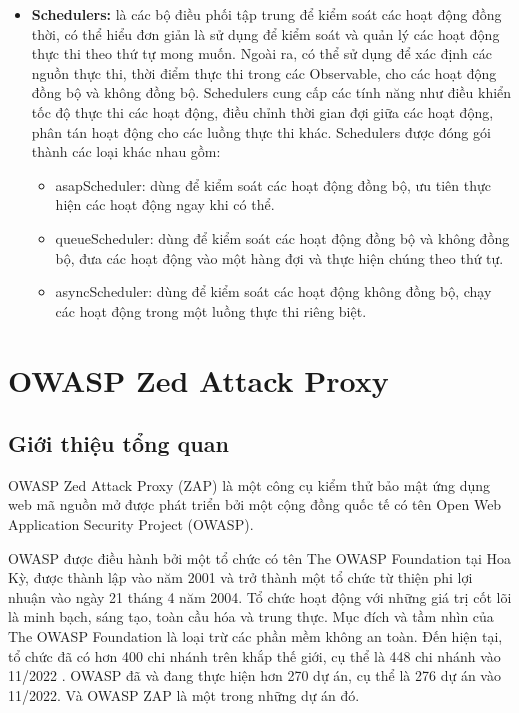 \begin{itemize}
  \item \textbf{Schedulers:} là các bộ điều phối tập trung để kiểm soát các hoạt động đồng thời, có thể hiểu đơn giản là sử dụng để kiểm soát và quản lý các hoạt động thực thi theo thứ tự mong muốn.
  Ngoài ra, có thể sử dụng để xác định các nguồn thực thi, thời điểm thực thi trong các Observable, cho các hoạt động đồng bộ và không đồng bộ.
  Schedulers cung cấp các tính năng như điều khiển tốc độ thực thi các hoạt động, điều chỉnh thời gian đợi giữa các hoạt động, phân tán hoạt động cho các luồng thực thi khác.
  Schedulers được đóng gói thành các loại khác nhau gồm:
  \begin{itemize}
    \item asapScheduler: dùng để kiểm soát các hoạt động đồng bộ, ưu tiên thực hiện các hoạt động ngay khi có thể.
    \item queueScheduler: dùng để kiểm soát các hoạt động đồng bộ và không đồng bộ, đưa các hoạt động vào một hàng đợi và thực hiện chúng theo thứ tự.
    \item asyncScheduler: dùng để kiểm soát các hoạt động không đồng bộ, chạy các hoạt động trong một luồng thực thi riêng biệt.
  \end{itemize}
\end{itemize}
 
\section{OWASP Zed Attack Proxy}

\subsection{Giới thiệu tổng quan}

\tab OWASP Zed Attack Proxy (ZAP) là một công cụ kiểm thử bảo mật ứng dụng web mã nguồn mở được phát triển bởi một cộng đồng quốc tế có tên Open Web Application Security Project (OWASP).
\par

OWASP được điều hành bởi một tổ chức có tên The OWASP Foundation tại Hoa Kỳ, được thành lập vào năm 2001 và trở thành một tổ chức từ thiện phi lợi nhuận vào ngày 21 tháng 4 năm 2004.
Tổ chức hoạt động với những giá trị cốt lõi là minh bạch, sáng tạo, toàn cầu hóa và trung thực.
Mục đích và tầm nhìn của The OWASP Foundation là loại trừ các phần mềm không an toàn.
Đến hiện tại, tổ chức đã có hơn 400 chi nhánh trên khắp thế giới, cụ thể là 448 chi nhánh vào 11/2022 . OWASP đã và đang thực hiện hơn 270 dự án, cụ thể là 276 dự án vào 11/2022. Và OWASP ZAP là một trong những dự án đó.
\par

